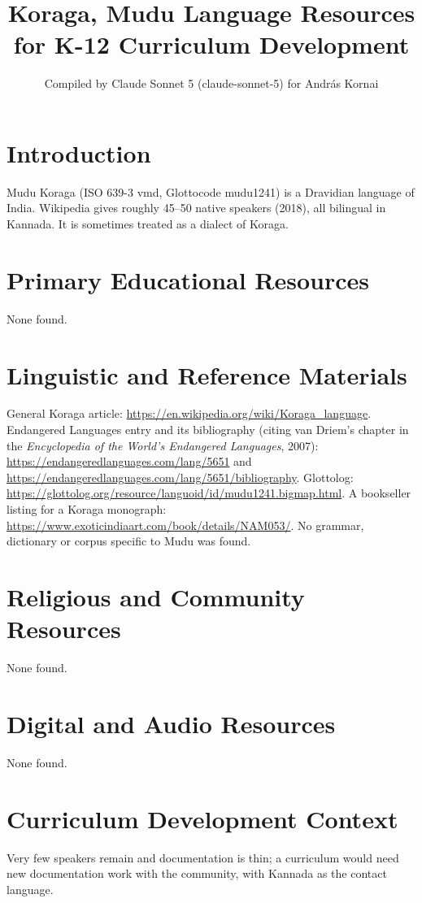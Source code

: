 \documentclass[12pt]{article}
\title{Koraga, Mudu Language Resources for K-12 Curriculum Development}
\author{Compiled by Claude Sonnet 5 (claude-sonnet-5) for Andr\'as Kornai}
\date{}
\begin{document}
\maketitle
\section{Introduction}
Mudu Koraga (ISO 639-3 vmd, Glottocode mudu1241) is a Dravidian language of India. Wikipedia gives roughly 45--50 native speakers (2018), all bilingual in Kannada. It is sometimes treated as a dialect of Koraga.
\section{Primary Educational Resources}
None found.
\section{Linguistic and Reference Materials}
General Koraga article: \url{https://en.wikipedia.org/wiki/Koraga_language}. Endangered Languages entry and its bibliography (citing van Driem's chapter in the \emph{Encyclopedia of the World's Endangered Languages}, 2007): \url{https://endangeredlanguages.com/lang/5651} and \url{https://endangeredlanguages.com/lang/5651/bibliography}. Glottolog: \url{https://glottolog.org/resource/languoid/id/mudu1241.bigmap.html}. A bookseller listing for a Koraga monograph: \url{https://www.exoticindiaart.com/book/details/NAM053/}. No grammar, dictionary or corpus specific to Mudu was found.
\section{Religious and Community Resources}
None found.
\section{Digital and Audio Resources}
None found.
\section{Curriculum Development Context}
Very few speakers remain and documentation is thin; a curriculum would need new documentation work with the community, with Kannada as the contact language.
\end{document}
